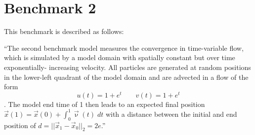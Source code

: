 \section*{Benchmark 2}

This benchmark is described as follows:
\begin{displayquote}
``The second benchmark model measures the convergence
in time-variable flow, which is simulated by a model domain 
with spatially constant but over time exponentially-
increasing velocity. All particles are generated at random
positions in the lower-left quadrant of the model domain
and are advected in a flow of the form
\[
u(t)=1 + e^t \qquad 
v(t)=1 + e^t 
\].
The model end time
of 1 then leads to an expected final
position $\vec{x}(1) = \vec{x}(0) + \int_0^1 \vec\upnu(t) \; dt$
 with a distance between the initial and end position of $d = ||\vec{x}_1-\vec{x}_0 ||_2 = 2e$.''
\end{displayquote}








